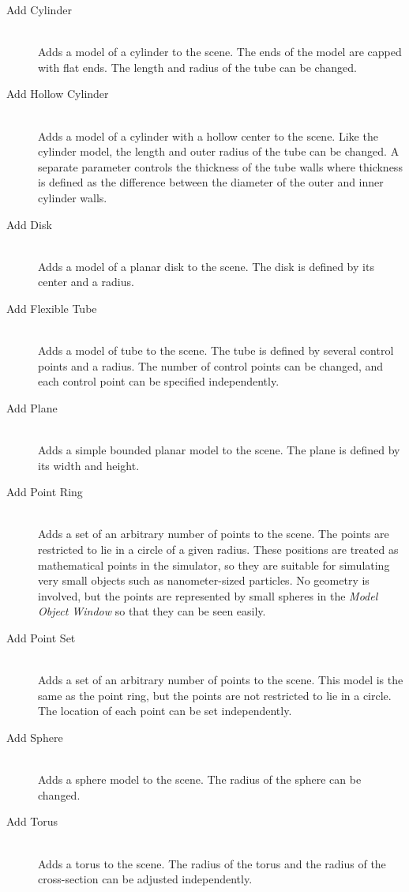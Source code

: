 \documentclass[11pt]{article}
\begin{document}
\begin{description}

  \item[Add Cylinder] \hfill \\
  Adds a model of a cylinder to the scene. The ends of the model are capped with flat ends. The length and radius of the tube can be changed.
  
  \item[Add Hollow Cylinder] \hfill \\
  Adds a model of a cylinder with a hollow center to the scene. Like the cylinder model, the length and outer radius of the tube can be changed. A separate parameter controls the thickness of the tube walls where thickness is defined as the difference between the diameter of the outer and inner cylinder walls.

  \item[Add Disk] \hfill \\
  Adds a model of a planar disk to the scene. The disk is defined by its center and a radius.

  \item[Add Flexible Tube] \hfill \\
  Adds a model of tube to the scene. The tube is defined by several control points and a radius. The number of control points can be changed, and each control point can be specified independently.
  
  \item[Add Plane] \hfill \\
  Adds a simple bounded planar model to the scene. The plane is defined by its width and height.
  
  \item[Add Point Ring] \hfill \\
  Adds a set of an arbitrary number of points to the scene. The points are restricted to lie in a circle of a given radius. These positions are treated as mathematical points in the simulator, so they are suitable for simulating very small objects such as nanometer-sized particles. No geometry is involved, but the points are represented by small spheres in the \emph{Model Object Window} so that they can be seen easily.
  
  \item[Add Point Set] \hfill \\
  Adds a set of an arbitrary number of points to the scene. This model is the same as the point ring, but the points are not restricted to lie in a circle. The location of each point can be set independently.
  
  \item[Add Sphere] \hfill \\
  Adds a sphere model to the scene. The radius of the sphere can be changed.

  \item[Add Torus] \hfill \\
  Adds a torus to the scene. The radius of the torus and the radius of the cross-section can be adjusted independently.

\end{description}
\end{document}
